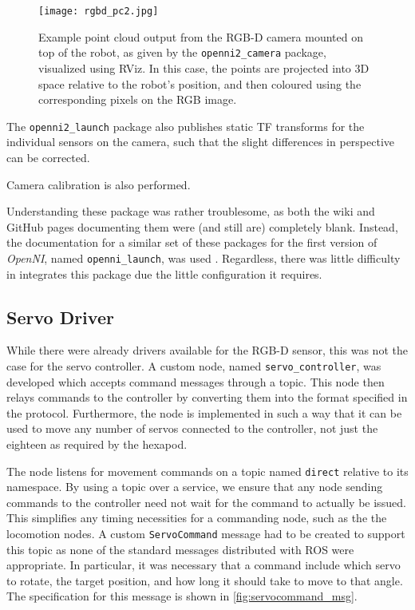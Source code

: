 \begin{figure}[h!]
    \centering
    \texttt{[image: rgbd\_pc2.jpg]}
    \caption{Example point cloud output from the RGB-D camera mounted on top of the robot, as given by the \texttt{openni2\_camera} package, visualized using RViz. In this case, the points are projected into 3D space relative to the robot's position, and then coloured using the corresponding pixels on the RGB image.}
    \label{fig:rgbd_images2}
\end{figure}

The \texttt{openni2\_launch} package also publishes static TF transforms for the individual sensors on the camera, such that the slight differences in perspective can be corrected.

Camera calibration is also performed.

Understanding these package was rather troublesome, as both the wiki and GitHub pages documenting them were (and still are) completely blank. Instead, the documentation for a similar set of these packages for the first version of \emph{OpenNI}, named \texttt{openni\_launch}, was used \cite{ros_wiki_openni_launch}. Regardless, there was little difficulty in integrates this package due the little configuration it requires.

\subsection{Servo Driver}

While there were already drivers available for the RGB-D sensor, this was not the case for the servo controller. A custom node, named \texttt{servo\_controller}, was developed which accepts command messages through a topic. This node then relays commands to the controller by converting them into the format specified in the protocol. Furthermore, the node is implemented in such a way that it can be used to move any number of servos connected to the controller, not just the eighteen as required by the hexapod.

The node listens for movement commands on a topic named \texttt{direct} relative to its namespace. By using a topic over a service, we ensure that any node sending commands to the controller need not wait for the command to actually be issued. This simplifies any timing necessities for a commanding node, such as the the locomotion nodes. A custom \texttt{ServoCommand} message had to be created to support this topic as none of the standard messages distributed with ROS were appropriate. In particular, it was necessary that a command include which servo to rotate, the target position, and how long it should take to move to that angle. The specification for this message is shown in \autoref{fig:servocommand_msg}.

